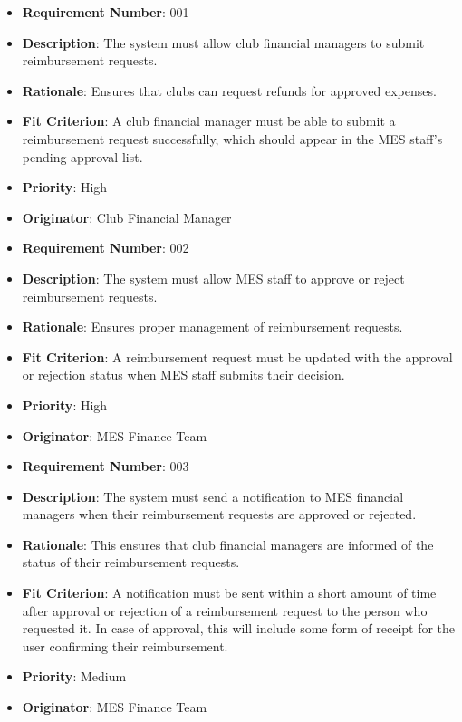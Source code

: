 \documentclass[12pt]{article}
\begin{document}
\begin{itemize}

  \item \textbf{Requirement Number}: 001
  \item \textbf{Description}: The system must allow club financial managers to submit reimbursement requests.
  \item \textbf{Rationale}: Ensures that clubs can request refunds for approved expenses.
  \item \textbf{Fit Criterion}: A club financial manager must be able to submit a reimbursement request successfully, which should appear in the MES staff's pending approval list.
  \item \textbf{Priority}: High
  \item \textbf{Originator}: Club Financial Manager
  
  \bigskip

  \item \textbf{Requirement Number}: 002
  \item \textbf{Description}: The system must allow MES staff to approve or reject reimbursement requests.
  \item \textbf{Rationale}: Ensures proper management of reimbursement requests.
  \item \textbf{Fit Criterion}: A reimbursement request must be updated with the approval or rejection status when MES staff submits their decision.
  \item \textbf{Priority}: High
  \item \textbf{Originator}: MES Finance Team

  \bigskip

  \item \textbf{Requirement Number}: 003
  \item \textbf{Description}: The system must send a notification to MES financial managers when their reimbursement requests are approved or rejected.
  \item \textbf{Rationale}: This ensures that club financial managers are informed of the status of their reimbursement requests.
  \item \textbf{Fit Criterion}: A notification must be sent within a short amount of time after approval or rejection of a reimbursement request to the person who requested it. In case of approval, this will include some form of receipt for the user confirming their reimbursement.
  \item \textbf{Priority}: Medium
  \item \textbf{Originator}: MES Finance Team


\end{itemize}
\end{document}
